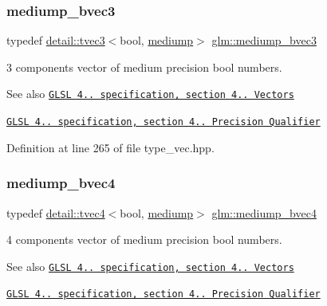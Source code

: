 \subsubsection{\texorpdfstring{mediump\+\_\+bvec3}{mediump\_bvec3}}
{\footnotesize\ttfamily typedef \hyperlink{structglm_1_1detail_1_1tvec3}{detail\+::tvec3}$<$bool, \hyperlink{namespaceglm_a0f04f086094c747d227af4425893f545a6416f3ea0c9025fb21ed50c4d6620482}{mediump}$>$ \hyperlink{group__core__precision_gae7c8d0136e829d6fe3feb00856e35f11}{glm\+::mediump\+\_\+bvec3}}

3 components vector of medium precision bool numbers.

\begin{DoxySeeAlso}{See also}
\href{http://www.opengl.org/registry/doc/GLSLangSpec.4.20.8.pdf}{\tt G\+L\+SL 4.. specification, section 4.. Vectors} 

\href{http://www.opengl.org/registry/doc/GLSLangSpec.4.20.8.pdf}{\tt G\+L\+SL 4.. specification, section 4.. Precision Qualifier} 
\end{DoxySeeAlso}


Definition at line 265 of file type\+\_\+vec.\+hpp.

\mbox{\label{group__core__precision_ga8bb7cfe902e2cb356450d211ca4d58e2}} 
\subsubsection{\texorpdfstring{mediump\+\_\+bvec4}{mediump\_bvec4}}
{\footnotesize\ttfamily typedef \hyperlink{structglm_1_1detail_1_1tvec4}{detail\+::tvec4}$<$bool, \hyperlink{namespaceglm_a0f04f086094c747d227af4425893f545a6416f3ea0c9025fb21ed50c4d6620482}{mediump}$>$ \hyperlink{group__core__precision_ga8bb7cfe902e2cb356450d211ca4d58e2}{glm\+::mediump\+\_\+bvec4}}

4 components vector of medium precision bool numbers.

\begin{DoxySeeAlso}{See also}
\href{http://www.opengl.org/registry/doc/GLSLangSpec.4.20.8.pdf}{\tt G\+L\+SL 4.. specification, section 4.. Vectors} 

\href{http://www.opengl.org/registry/doc/GLSLangSpec.4.20.8.pdf}{\tt G\+L\+SL 4.. specification, section 4.. Precision Qualifier} 
\end{DoxySeeAlso}


